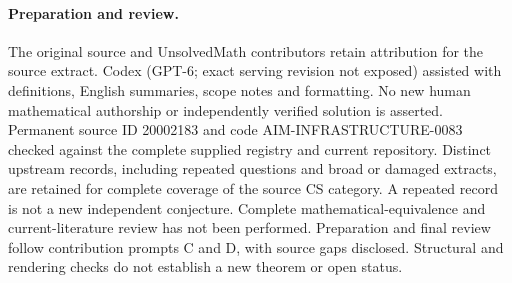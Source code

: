 \documentclass[11pt]{article}
\begin{document}
\paragraph{Preparation and review.}
The original source and UnsolvedMath contributors retain attribution for the source extract. Codex (GPT-6; exact serving revision not exposed) assisted with definitions, English summaries, scope notes and formatting. No new human mathematical authorship or independently verified solution is asserted. Permanent source ID 20002183 and code AIM-INFRASTRUCTURE-0083 checked against the complete supplied registry and current repository. Distinct upstream records, including repeated questions and broad or damaged extracts, are retained for complete coverage of the source CS category. A repeated record is not a new independent conjecture. Complete mathematical-equivalence and current-literature review has not been performed. Preparation and final review follow contribution prompts C and D, with source gaps disclosed. Structural and rendering checks do not establish a new theorem or open status.
\label{end:20002183}
\end{document}

